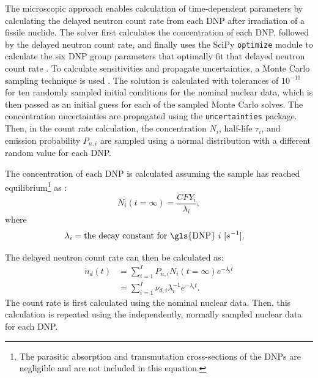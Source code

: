 \documentclass[hidelinks]{style/nseJournal}
\begin{document}
The microscopic approach enables calculation of time-dependent parameters by calculating the delayed neutron count rate from each \gls{DNP} after irradiation of a fissile nuclide.
The solver first calculates the concentration of each \gls{DNP}, followed by the delayed neutron count rate, and finally uses the SciPy \texttt{optimize} module to calculate the six \gls{DNP} group parameters that optimally fit that delayed neutron count rate \cite{scipy}.
To calculate sensitivities and propagate uncertainties, a Monte Carlo sampling technique is used \cite{foligno_new_2019}.
The solution is calculated with tolerances of $10^{-11}$ for ten randomly sampled initial conditions for the nominal nuclear data, which is then passed as an initial guess for each of the sampled Monte Carlo solves.
The concentration uncertainties are propagated using the \texttt{uncertainties} package.
Then, in the count rate calculation, the concentration $N_i$, half-life $\tau_i$, and emission probability $P_{n,i}$ are sampled using a normal distribution with a different random value for each \gls{DNP}.

The concentration of each \gls{DNP} is calculated assuming the sample has reached equilibrium\footnote{The parasitic absorption and transmutation cross-sections of the \glspl{DNP} are negligible and are not included in this equation.} as \cite{huynh2014calculation}:
\begin{equation}
    N_{i}(t=\infty) = \frac{CFY_i}{\lambda_i},
    \label{eq:conc}
\end{equation}
where
\begin{align}
    \lambda_i &= \text{the decay constant for \gls{DNP} $i$ $[s^{-1}]$.} \nonumber 
\end{align}

The delayed neutron count rate can then be calculated as:
\begin{align}
    \dot{n}_d(t) &= \sum_{i=1}^I P_{n,i} N_i(t=\infty) e^{-\lambda_i t} \nonumber\\ 
    &= \sum_{i=1}^I \nu_{d,i} \lambda_{i}^{-1} e^{-\lambda_i t}.
    \label{eq:count-rate}
\end{align}
The count rate is first calculated using the nominal nuclear data.
Then, this calculation is repeated using the independently, normally sampled nuclear data for each \gls{DNP}.
\end{document}

